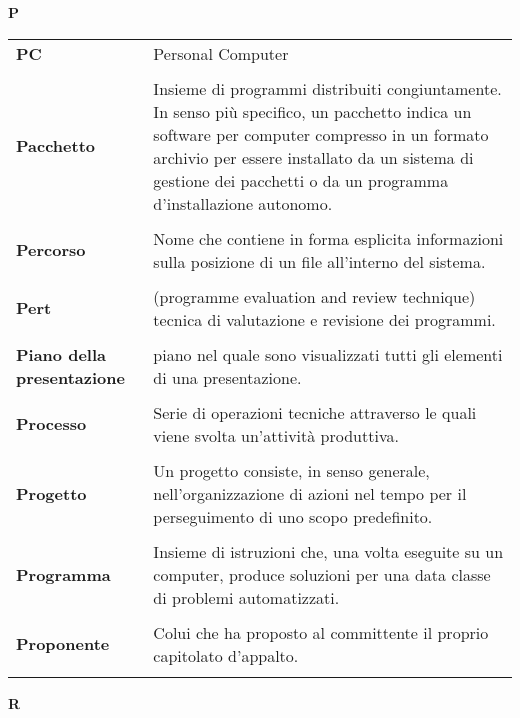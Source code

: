 \newpage 
{} 
{} 
\hfill\Huge{\textbf{P}} \\ 
\normalsize 
\begin{longtable}{L{4cm} p{10cm}}
\textbf{PC} & Personal Computer \\ 
 \\ 
\textbf{Pacchetto} & Insieme di programmi distribuiti congiuntamente. In senso più specifico, un pacchetto indica un software per computer compresso in un formato archivio per essere installato da un sistema di gestione dei pacchetti o da un programma d'installazione autonomo. \\ 
 \\ 
\textbf{Percorso} & Nome che contiene in forma esplicita informazioni sulla posizione di un file all'interno del sistema. \\ 
 \\ 
\textbf{Pert} & (programme evaluation and review technique) tecnica di valutazione e revisione dei programmi. \\ 
 \\ 
\textbf{Piano della presentazione} & piano nel quale sono visualizzati tutti gli elementi di una presentazione. \\ 
 \\ 
\textbf{Processo} & Serie di operazioni tecniche attraverso le quali viene svolta un'attività produttiva. \\ 
 \\ 
\textbf{Progetto} & Un progetto consiste, in senso generale, nell'organizzazione di azioni nel tempo per il perseguimento di uno scopo predefinito. \\ 
 \\ 
\textbf{Programma} & Insieme di istruzioni che, una volta eseguite su un computer, produce soluzioni per una data classe di problemi automatizzati. \\ 
 \\ 
\textbf{Proponente} & Colui che ha proposto al committente il proprio capitolato d’appalto. \\ 
 \\ 
\end{longtable} 
\newpage 
{} 
{} 
\hfill\Huge{\textbf{R}} \\ 
\normalsize 
